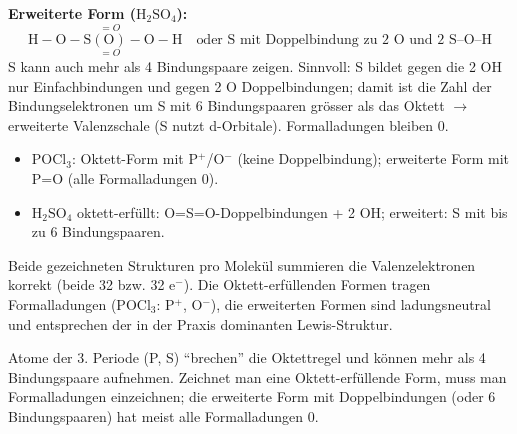 \textbf{Erweiterte Form ($\mathrm{H_2SO_4}$):}
\[
  \mathrm{H}{-}\mathrm{O}{-}\mathrm{S}\overset{\,=O}{\underset{\,=O}{\mathrm{(O)}}}{-}\mathrm{O}{-}\mathrm{H}
  \quad\text{oder S mit Doppelbindung zu 2 O und 2 S--O--H}
\]
S kann auch mehr als 4 Bindungspaare zeigen. Sinnvoll: S bildet
gegen die 2 OH nur Einfachbindungen und gegen 2 O Doppelbindungen; damit
ist die Zahl der Bindungselektronen um S mit 6 Bindungspaaren gr\"osser als
das Oktett $\rightarrow$ erweiterte Valenzschale (S nutzt d-Orbitale).
Formalladungen bleiben 0.

\begin{ergebnis}
\begin{itemize}
  \item $\mathrm{POCl_3}$: Oktett-Form mit P$^{+}$/O$^{-}$ (keine
        Doppelbindung); erweiterte Form mit P=O (alle Formalladungen 0).
  \item $\mathrm{H_2SO_4}$ oktett-erfüllt: O=S=O-Doppelbindungen + 2 OH;
        erweitert: S mit bis zu 6 Bindungspaaren.
\end{itemize}
\end{ergebnis}

\begin{kontrolle}
Beide gezeichneten Strukturen pro Molekül summieren die Valenzelektronen
korrekt (beide 32 bzw. 32 e${}^-$). Die Oktett-erfüllenden Formen tragen
Formalladungen (POCl$_3$: P$^{+}$, O$^{-}$), die erweiterten Formen sind
ladungsneutral und entsprechen der in der Praxis dominanten Lewis-Struktur.
\end{kontrolle}

\begin{merksatz}
Atome der 3. Periode (P, S) ``brechen'' die Oktettregel und k\"onnen mehr
als 4 Bindungspaare aufnehmen. Zeichnet man eine Oktett-erf\"ullende Form,
muss man Formalladungen einzeichnen; die erweiterte Form mit
Doppelbindungen (oder 6 Bindungspaaren) hat meist alle Formalladungen 0.
\end{merksatz}
